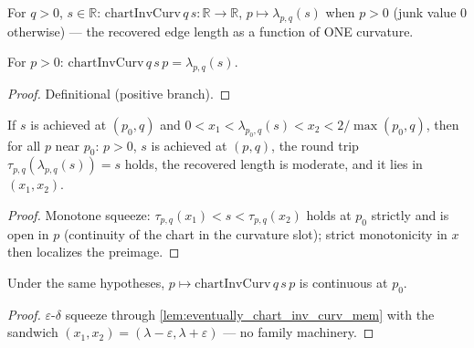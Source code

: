 \begin{definition}
  \label{def:chart_inv_curv}
  For $q > 0$, $s \in \mathbb{R}$:
  $\mathrm{chartInvCurv}\,q\,s : \mathbb{R} \to \mathbb{R}$,
  $p \mapsto \lambda_{p,q}(s)$ when $p > 0$ (junk value $0$ otherwise) ---
  the recovered edge length as a function of ONE curvature.
\end{definition}

\begin{lemma}
  \label{lem:chart_inv_curv_of_pos}
  For $p > 0$: $\mathrm{chartInvCurv}\,q\,s\,p = \lambda_{p,q}(s)$.
\end{lemma}
\begin{proof}

\leanok
  Definitional (positive branch).
\end{proof}

\begin{lemma}
  \label{lem:eventually_chart_inv_curv_mem}
  If $s$ is achieved at $(p_0, q)$ and $0 < x_1 < \lambda_{p_0,q}(s) < x_2 <
  2/\max(p_0,q)$, then for all $p$ near $p_0$: $p > 0$, $s$ is achieved at
  $(p, q)$, the round trip $\tau_{p,q}(\lambda_{p,q}(s)) = s$ holds, the
  recovered length is moderate, and it lies in $(x_1, x_2)$.
\end{lemma}
\begin{proof}

\leanok
  Monotone squeeze: $\tau_{p,q}(x_1) < s < \tau_{p,q}(x_2)$ holds at
  $p_0$ strictly and is open in $p$ (continuity of the chart in the
  curvature slot); strict monotonicity in $x$ then localizes the preimage.
\end{proof}

\begin{lemma}
  \label{lem:continuous_at_chart_inv_curv}
  Under the same hypotheses, $p \mapsto \mathrm{chartInvCurv}\,q\,s\,p$ is
  continuous at $p_0$.
\end{lemma}
\begin{proof}

\leanok
  $\varepsilon$-$\delta$ squeeze through
  \cref{lem:eventually_chart_inv_curv_mem} with the sandwich
  $(x_1, x_2) = (\lambda - \varepsilon, \lambda + \varepsilon)$ --- no family
  machinery.
\end{proof}

